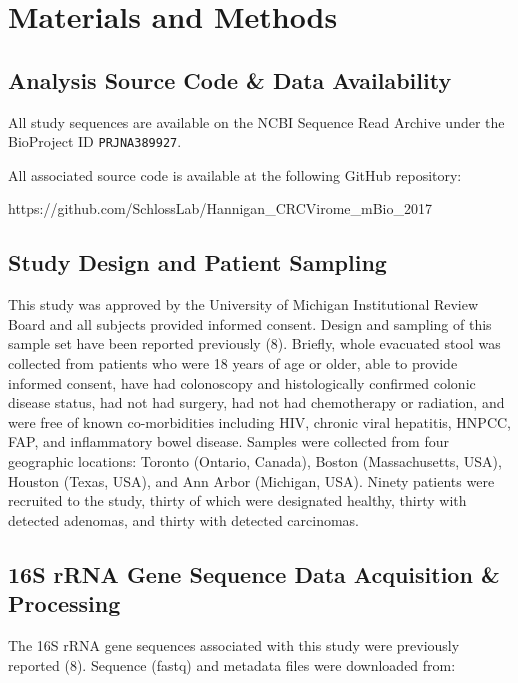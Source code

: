 \documentclass[12pt,]{article}
\begin{document}
\section{Materials and Methods}\label{materials-and-methods}

\subsection{Analysis Source Code \& Data
Availability}\label{analysis-source-code-data-availability}

All study sequences are available on the NCBI Sequence Read Archive
under the BioProject ID \texttt{PRJNA389927}.

All associated source code is available at the following GitHub
repository:

https://github.com/SchlossLab/Hannigan\_CRCVirome\_mBio\_2017

\subsection{Study Design and Patient
Sampling}\label{study-design-and-patient-sampling}

This study was approved by the University of Michigan Institutional
Review Board and all subjects provided informed consent. Design and
sampling of this sample set have been reported previously (8). Briefly,
whole evacuated stool was collected from patients who were 18 years of
age or older, able to provide informed consent, have had colonoscopy and
histologically confirmed colonic disease status, had not had surgery,
had not had chemotherapy or radiation, and were free of known
co-morbidities including HIV, chronic viral hepatitis, HNPCC, FAP, and
inflammatory bowel disease. Samples were collected from four geographic
locations: Toronto (Ontario, Canada), Boston (Massachusetts, USA),
Houston (Texas, USA), and Ann Arbor (Michigan, USA). Ninety patients
were recruited to the study, thirty of which were designated healthy,
thirty with detected adenomas, and thirty with detected carcinomas.

\subsection{16S rRNA Gene Sequence Data Acquisition \&
Processing}\label{s-rrna-gene-sequence-data-acquisition-processing}

The 16S rRNA gene sequences associated with this study were previously
reported (8). Sequence (fastq) and metadata files were downloaded from:
\end{document}
